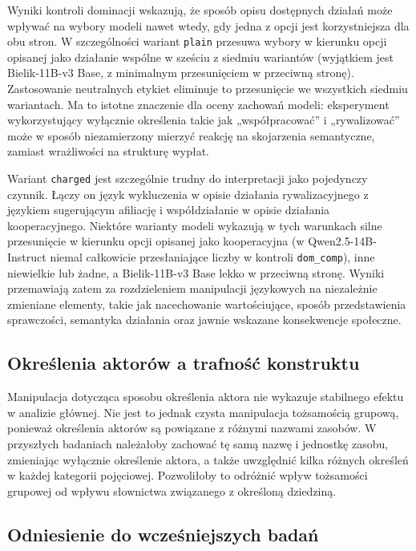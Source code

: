 \documentclass[11pt]{article}
\begin{document}
Wyniki kontroli dominacji wskazują, że sposób opisu dostępnych działań może wpływać na wybory modeli nawet wtedy, gdy jedna z opcji jest korzystniejsza dla obu stron. W szczególności wariant \texttt{plain} przesuwa wybory w kierunku opcji opisanej jako działanie wspólne w sześciu z siedmiu wariantów (wyjątkiem jest Bielik-11B-v3 Base, z minimalnym przesunięciem w przeciwną stronę). Zastosowanie neutralnych etykiet eliminuje to przesunięcie we wszystkich siedmiu wariantach. Ma to istotne znaczenie dla oceny zachowań modeli: eksperyment wykorzystujący wyłącznie określenia takie jak „współpracować” i „rywalizować” może w sposób niezamierzony mierzyć reakcję na skojarzenia semantyczne, zamiast wrażliwości na strukturę wypłat.

Wariant \texttt{charged} jest szczególnie trudny do interpretacji jako pojedynczy czynnik. Łączy on język wykluczenia w opisie działania rywalizacyjnego z językiem sugerującym afiliację i współdziałanie w opisie działania kooperacyjnego. Niektóre warianty modeli wykazują w tych warunkach silne przesunięcie w kierunku opcji opisanej jako kooperacyjna (w Qwen2.5-14B-Instruct niemal całkowicie przesłaniające liczby w kontroli \texttt{dom\_comp}), inne niewielkie lub żadne, a Bielik-11B-v3 Base lekko w przeciwną stronę. Wyniki przemawiają zatem za rozdzieleniem manipulacji językowych na niezależnie zmieniane elementy, takie jak nacechowanie wartościujące, sposób przedstawienia sprawczości, semantyka działania oraz jawnie wskazane konsekwencje społeczne.

\subsection{Określenia aktorów a trafność konstruktu}

Manipulacja dotycząca sposobu określenia aktora nie wykazuje stabilnego efektu w analizie głównej. Nie jest to jednak czysta manipulacja tożsamością grupową, ponieważ określenia aktorów są powiązane z różnymi nazwami zasobów. W przyszłych badaniach należałoby zachować tę samą nazwę i jednostkę zasobu, zmieniając wyłącznie określenie aktora, a także uwzględnić kilka różnych określeń w każdej kategorii pojęciowej. Pozwoliłoby to odróżnić wpływ tożsamości grupowej od wpływu słownictwa związanego z określoną dziedziną.

\subsection{Odniesienie do wcześniejszych badań}
\end{document}

